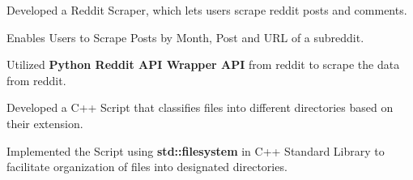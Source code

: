 \documentclass[]{deedy-resume-openfont}
\begin{document}
\begin{minipage}[t]{0.66\textwidth}




    \begin{tightemize}
        \item Developed a Reddit Scraper, which lets users scrape reddit posts and comments.
        \item Enables Users to Scrape Posts by Month, Post and URL of a subreddit.
        \item Utilized \textbf{Python Reddit API Wrapper API} from reddit to scrape the data from reddit.
    \end{tightemize}
    \sectionsep


    \begin{tightemize}
        \item Developed a C++ Script that classifies files into different directories based on their extension.
        \item Implemented the Script using {\textbf{std::filesystem}} in C++ Standard Library to facilitate organization of files into designated directories.
    \end{tightemize}
    \sectionsep





\end{minipage}
\end{document}

